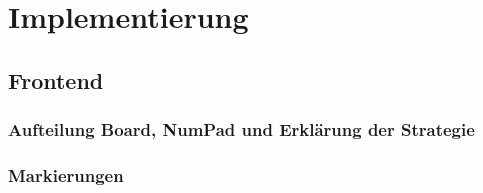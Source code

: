 
\part{Implementierung}

\chapter{Frontend}

\section{Aufteilung Board, NumPad und Erklärung der Strategie}

\section{Markierungen}